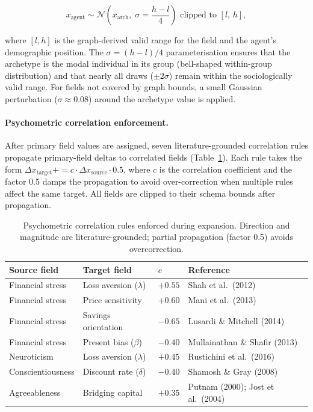 \documentclass[sustainability,article,submit,pdftex,moreauthors]{Definitions/mdpi}
\begin{document}
\begin{linenomath}
\begin{equation}
  x_\text{agent} \sim \mathcal{N}\!\left(x_\text{arch},\;
                       \sigma = \frac{h - l}{4}\right)
                  \text{ clipped to } [l,\, h],
  \label{eq:sampling}
\end{equation}
\end{linenomath}

where $[l, h]$ is the graph-derived valid range for the field and the
agent's demographic position. The $\sigma = (h - l)/4$ parameterisation
ensures that the archetype is the modal individual in its group (bell-shaped
within-group distribution) and that nearly all draws ($\pm 2\sigma$) remain
within the sociologically valid range. For fields not covered by graph
bounds, a small Gaussian perturbation ($\sigma \approx 0.08$) around the
archetype value is applied.

\paragraph{Psychometric correlation enforcement.}
After primary field values are assigned, seven literature-grounded
correlation rules propagate primary-field deltas to correlated fields
(Table~\ref{tab:correlations}). Each rule takes the form
$\Delta x_\text{target} += c \cdot \Delta x_\text{source} \cdot 0.5$,
where $c$ is the correlation coefficient and the factor 0.5 damps the
propagation to avoid over-correction when multiple rules affect the same
target. All fields are clipped to their schema bounds after propagation.

\begin{table}[H]
\caption{Psychometric correlation rules enforced during expansion.
Direction and magnitude are literature-grounded; partial propagation
(factor 0.5) avoids overcorrection.}
\label{tab:correlations}
\begin{tabularx}{\textwidth}{p{4.0cm}p{4.0cm}Xp{3.0cm}}
\toprule
\textbf{Source field} & \textbf{Target field} & \textbf{$c$} & \textbf{Reference} \\
\midrule
Financial stress      & Loss aversion ($\lambda$)   & $+0.55$ & Shah et al.\ (2012) \\
Financial stress      & Price sensitivity            & $+0.60$ & Mani et al.\ (2013) \\
Financial stress      & Savings orientation          & $-0.65$ & Lusardi \& Mitchell (2014) \\
Financial stress      & Present bias ($\beta$)       & $-0.40$ & Mullainathan \& Shafir (2013) \\
Neuroticism           & Loss aversion ($\lambda$)   & $+0.45$ & Rustichini et al.\ (2016) \\
Conscientiousness     & Discount rate ($\delta$)    & $-0.40$ & Shamosh \& Gray (2008) \\
Agreeableness         & Bridging capital             & $+0.35$ & Putnam (2000); Jost et al.\ (2004) \\
\bottomrule
\end{tabularx}
\end{table}
\end{document}
